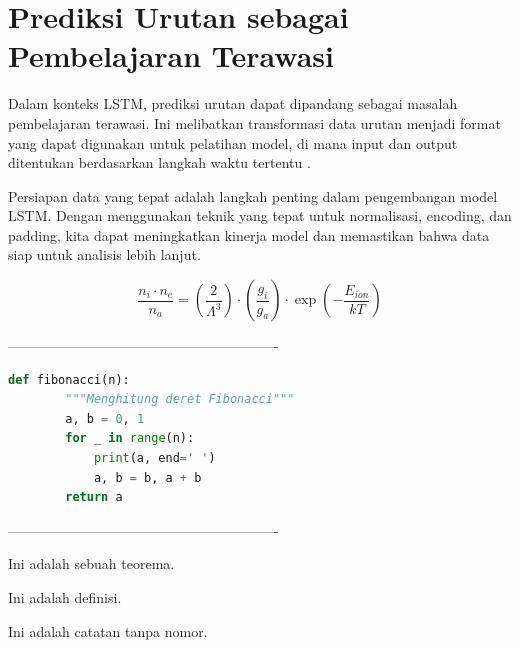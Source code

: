 \section{Prediksi Urutan sebagai Pembelajaran Terawasi}
\par Dalam konteks LSTM, prediksi urutan dapat dipandang sebagai masalah pembelajaran terawasi. Ini melibatkan transformasi data urutan menjadi format yang dapat digunakan untuk pelatihan model, di mana input dan output ditentukan berdasarkan langkah waktu tertentu \citep{brownlee2017}.


\par Persiapan data yang tepat adalah langkah penting dalam pengembangan model LSTM. Dengan menggunakan teknik yang tepat untuk normalisasi, encoding, dan padding, kita dapat meningkatkan kinerja model dan memastikan bahwa data siap untuk analisis lebih lanjut.

\begin{equation}
    \frac{n_i \cdot n_e}{n_a} = \left( \frac{2}{\Lambda^3} \right) \cdot \left( \frac{g_i}{g_a} \right) \cdot \exp \left( -\frac{E_{ion}}{kT} \right)
    \label{eq:rate}
\end{equation}


----------------------------------------------------------%
\begin{lstlisting}[language=Python, caption=Contoh Fungsi Python]
    def fibonacci(n):
        """Menghitung deret Fibonacci"""
        a, b = 0, 1
        for _ in range(n):
            print(a, end=' ')
            a, b = b, a + b
        return a
    \end{lstlisting}
----------------------------------------------------------




\begin{theorem}
Ini adalah sebuah teorema.
\end{theorem}

\begin{definition}
Ini adalah definisi.
\end{definition}

\begin{remark}
Ini adalah catatan tanpa nomor.
\end{remark} 

